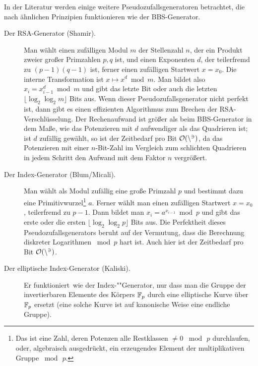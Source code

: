 \begin{refsegment}
In der Literatur werden einige weitere Pseudozufallsgeneratoren betrachtet, die
nach ähnlichen Prinzipien funktionieren wie der BBS-Generator.
\begin{description}
  \item[Der RSA-Generator (Shamir).]
     Man wählt einen zufälligen Modul
     $m$ der Stellenzahl $n$, der ein Produkt zweier großer Primzahlen $p, q$ ist,
     und einen Exponenten $d$, der teilerfremd zu $(p-1)(q-1)$ ist, ferner
     einen zufälligen Startwert $x = x_0$. Die
     interne Transformation ist $x \mapsto x^d \bmod m$.
     Man bildet also $x_i = x_{i-1}^d \bmod m$ und gibt das letzte Bit
     oder auch die letzten $\lfloor \log_2 \log_2 m \rfloor$ Bits aus. Wenn dieser
     Pseudozufallsgenerator nicht perfekt ist,
     dann gibt es einen effizienten Algorithmus zum Brechen
     der RSA-Verschlüsselung. Der Rechenaufwand ist größer als beim
     BBS-Generator in dem Maße, wie das Potenzieren
     mit $d$ aufwendiger als das Quadrieren ist; ist $d$ zufällig gewählt,
     so ist der Zeitbedarf pro Bit $\cal{O}(n^3)$, da das Potenzieren mit einer
     $n$-Bit-Zahl im Vergleich zum schlichten Quadrieren in jedem Schritt den
     Aufwand mit dem Faktor $n$ vergrößert.
  \item[Der Index-Generator
     (Blum/Micali).]
     Man wählt als Modul zufällig
     eine große Primzahl $p$ und bestimmt dazu eine
     Primitivwurzel\footnote{%
     Das ist eine Zahl, deren Potenzen alle Restklassen $\neq 0$ $\bmod\, p$
     durchlaufen, oder, algebraisch ausgedrückt, ein erzeugendes Element
     der multiplikativen Gruppe $\bmod\, p$.
     } $a$. Ferner
     wählt man einen zufälligen Startwert $x = x_0$, teilerfremd zu $p-1$.
     Dann bildet man $x_i = a^{x_{i-1}} \bmod p$ und gibt das erste oder die
     ersten $\lfloor \log_2 \log_2 p \rfloor$ Bits aus.
     Die Perfektheit dieses Pseudozufallsgenerators beruht auf der Vermutung,
     dass die Berechnung diskreter
     Logarithmen
     $\bmod p$ hart ist. Auch hier ist der Zeitbedarf pro Bit $\cal{O}(n^3)$.
  \item[Der elliptische Index-Generator (Kaliski).] Er funktioniert~wie
     der Index-""Generator, nur dass man die Gruppe der invertierbaren
     Elemente des Körpers $\mathbb{F}_p$ durch eine
     elliptische Kurve
     über $\mathbb{F}_p$ ersetzt
     (eine solche Kurve ist auf kanonische Weise eine endliche Gruppe).
\end{description}


\end{refsegment}
